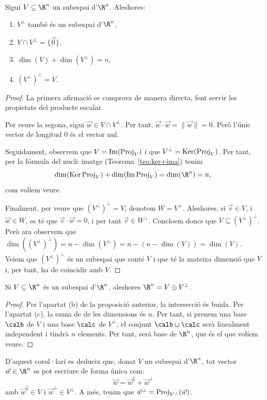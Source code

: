 \begin{proposicio}
Sigui $V\subseteq \R^n$ un subespai d'$\R^n$. Aleshores:
\begin{enumerate}[\rm (a)]
    \item $V^\perp$ també és un subespai d'$\R^n$,
    \item $V \cap V^\perp = \{\vec 0\}$,
    \item $\dim(V)+\dim(V^\perp) = n$,
    \item $(V^\perp)^\perp = V$.
\end{enumerate}
\end{proposicio}
\begin{proof}
La primera afirmació es comprova de manera directa, fent servir les propietats del producte escalar.

Per veure la segona, sigui $\vec w\in V\cap V^\perp$. Per tant, $\vec w\cdot\vec w =\| \vec w\|= 0$. Però l'únic vector de longitud $0$ és el vector nul.

Seguidament, observem que $V=\operatorname{Im}(\operatorname{Proj}_V)$ i que $V^\perp = \operatorname{Ker}(\operatorname{Proj}_V)$. Per tant, per la fórmula del nucli--imatge (Teorema~\ref{teo:ker+ima}) tenim
\[
\dim(\Ker\proj_V) + \dim(\Ima\proj_V) = \dim(\R^n)=n,
\]
com volíem veure.

Finalment, per veure que $(V^\perp)^\perp = V$, denotem $W=V^\perp$. Aleshores, si $\vec v\in V$, i $\vec w\in W$, es té que $\vec v\cdot \vec w = 0$, i per tant $\vec v\in W^\perp$. Concloem doncs que $V\subseteq (V^\perp)^\perp$. Però ara observem que $\dim((V^\perp)^\perp) = n - \dim(V^\perp) = n- (n-\dim(V)) = \dim(V)$. Veiem que $(V^\perp)^\perp$ és un subespai que conté $V$ i que té la mateixa dimensió que $V$ i, per tant, ha de coincidir amb $V$.
\end{proof}
\begin{corollari}\label{cor:V+Vper}
Si $V\subseteq\R^n$ és un subespai d'$\R^n$, aleshores $\R^n=V\oplus V^\perp$.
\end{corollari}
\begin{proof}
Per l'apartat (b) de la proposició anterior, la intersecció és buida. Per l'apartat (c), la suma de de les dimensions és $n$. Per tant, si prenem una base $\calb$ de $V$ i una base $\calc$ de $V^\perp$, el conjunt $\calb\cup\calc$ serà linealment independent i tindrà $n$ elements. Per tant, serà base de $\R^n$, que és el que volíem veure.
\end{proof}
D'aquest corol·lari es dedueix que, donat $V$ un subespai d'$\R^n$, tot vector $\vec w\in\R^n$ es pot escriure de forma única com:
\[
\vec w = \vec w^\parallel + \vec w^\perp
\]
amb $\vec w^\parallel \in V$ i $\vec w^\perp \in V^\perp$. A més, tenim que $\vec w^\perp=\operatorname{Proj}_{V^\perp}(\vec w)$.

